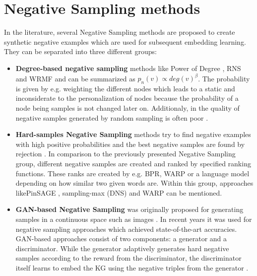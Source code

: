 \section{Negative Sampling methods} 
In the literature, several Negative Sampling methods are proposed to create synthetic negative examples which are used for subsequent embedding learning.
They can be separated into three different groups:
\begin{itemize}
    \item 
    \textbf{Degree-based negative sampling} methods like Power of Degree \cite{MikolovSCCD13}, \ac{RNS}\cite{Dupre2018Word2vec} and \ac{WRMF} \cite{Hu2008Collaborative} and can be summarized as $p_n(v) \propto deg(v)^\beta$.
    The probability is given by e.g. weighting the different nodes which leads to a 
    static and inconsiderate to the personalization of nodes \cite{MCNS} because the probability of a node being samples is not changed later on.
    Additionaly, in the quality of negative samples generated by random sampling is  often poor \cite{cai2017kbgan}.
    
    \item 
    \textbf{Hard-samples Negative Sampling} methods try to find negative examples with high positive probabilities and the best negative samples are found by rejection \cite{MCNS}. 
    In comparison to the previously presented Negative Sampling group, 
    different negative samples are created and ranked by specified ranking functions.
    These ranks are created by e.g. \ac{BPR}, \ac{WARP} or a language model depending on how similar two given words are. 
    Within this group, approaches like\ac{PinSAGE} \cite{PinSAGE}, sampling-max (\ac{DNS}) \cite{DNS} and \ac{WARP} \cite{WARP} can be mentioned.
    
    \item 
    \textbf{\ac{GAN}-based Negative Sampling} was originally proposed for
    generating samples in a continuous space such as images \cite{cai2017kbgan}.
    In recent years it was used for negative sampling approaches which achieved state-of-the-art accuracies. 
    \ac{GAN}-based approaches consist of two components:
    a generator and a discriminator. 
    While the generator adaptively generates hard negative samples according to the reward from the discriminator, the discriminator itself learns to embed the \ac{KG} using the negative triples from the generator \cite{IGAN}.
    
\end{itemize}

